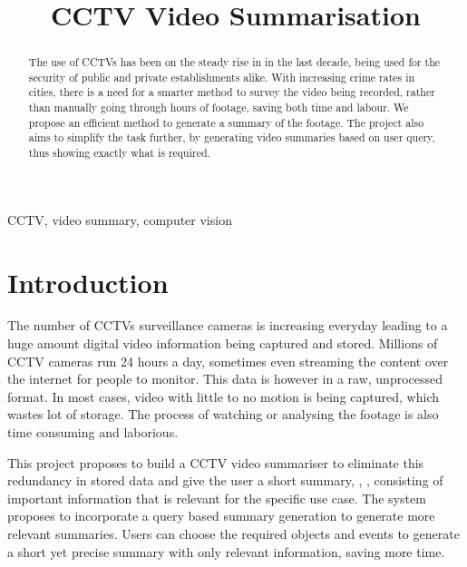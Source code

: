 \documentclass[conference]{IEEEtran}
\begin{document}
\title{CCTV Video Summarisation}

\author{
}
\maketitle

\begin{abstract}
The use of CCTVs has been on the steady rise in in the last decade, being used for the security of public and private establishments alike. With increasing crime rates in cities, there is a need for a smarter method to survey the video being recorded, rather than manually going through hours of footage, saving both time and labour. We propose an efficient method to generate a summary of the footage. The project also aims to simplify the task further, by generating video summaries based on user query, thus showing exactly what is required.

\end{abstract}

\begin{IEEEkeywords}
CCTV, video summary, computer vision
\end{IEEEkeywords}

\section{Introduction}
\par
The number of CCTVs surveillance cameras is increasing everyday leading to
a huge amount digital video information being captured and stored. Millions of
CCTV cameras run 24 hours a day, sometimes even streaming the content over the
internet for people to monitor. This data is however in a raw, unprocessed
format.  In most cases, video with little to no motion is being captured,
which wastes lot of storage. The process of watching or analysing the footage is
also time consuming and laborious.

This project proposes to build a CCTV video summariser to eliminate this
redundancy in stored data and give the user a short summary\cite{oh2005video}, \cite{nam1999video}, \cite{li2001overview},
\cite{Chu_2015_CVPR} consisting of
important information that is relevant for the specific use case. The system
proposes to incorporate a query based summary generation to generate more
relevant summaries. Users can choose the required objects and events to generate
a short yet precise summary with only relevant information, saving more time.
\end{document}
